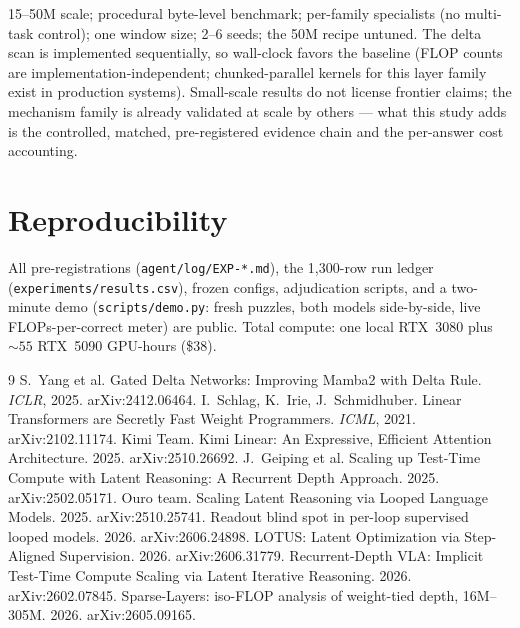 \documentclass[10pt]{article}
\begin{document}
15--50M scale; procedural byte-level benchmark; per-family specialists (no
multi-task control); one window size; 2--6 seeds; the 50M recipe untuned. The
delta scan is implemented sequentially, so wall-clock favors the baseline
(FLOP counts are implementation-independent; chunked-parallel kernels for this
layer family exist in production systems). Small-scale results do not license
frontier claims; the mechanism family is already validated at scale by others
--- what this study adds is the controlled, matched, pre-registered evidence
chain and the per-answer cost accounting.

\section{Reproducibility}

All pre-registrations (\texttt{agent/log/EXP-*.md}), the 1{,}300-row run
ledger (\texttt{experiments/results.csv}), frozen configs, adjudication
scripts, and a two-minute demo (\texttt{scripts/demo.py}: fresh puzzles, both
models side-by-side, live FLOPs-per-correct meter) are public. Total compute:
one local RTX~3080 plus ${\sim}55$ RTX~5090 GPU-hours (\${}38).

\begin{thebibliography}{9}\small
{} S.~Yang et al. Gated Delta Networks: Improving Mamba2 with Delta Rule. \emph{ICLR}, 2025. arXiv:2412.06464.
 I.~Schlag, K.~Irie, J.~Schmidhuber. Linear Transformers are Secretly Fast Weight Programmers. \emph{ICML}, 2021. arXiv:2102.11174.
 Kimi Team. Kimi Linear: An Expressive, Efficient Attention Architecture. 2025. arXiv:2510.26692.
 J.~Geiping et al. Scaling up Test-Time Compute with Latent Reasoning: A Recurrent Depth Approach. 2025. arXiv:2502.05171.
 Ouro team. Scaling Latent Reasoning via Looped Language Models. 2025. arXiv:2510.25741.
 Readout blind spot in per-loop supervised looped models. 2026. arXiv:2606.24898.
 LOTUS: Latent Optimization via Step-Aligned Supervision. 2026. arXiv:2606.31779.
 Recurrent-Depth VLA: Implicit Test-Time Compute Scaling via Latent Iterative Reasoning. 2026. arXiv:2602.07845.
 Sparse-Layers: iso-FLOP analysis of weight-tied depth, 16M--305M. 2026. arXiv:2605.09165.
\end{thebibliography}
\end{document}
